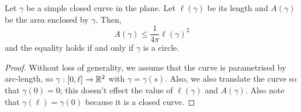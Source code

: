 \documentclass[11pt]{penrose}
\begin{document}
\begin{nthm}
    Let $\gamma$ be a simple closed curve in the plane. Let $\ell(\gamma)$ be its length and $A(\gamma)$ be the area enclosed by $\gamma$. Then,
    \begin{equation}
        A(\gamma) \leq \frac{1}{4\pi} \ell(\gamma)^2
    \end{equation}
    and the equality holds if and only if $\gamma$ is a circle.
\end{nthm}
\begin{proof}
    Without loss of generality, we assume that the curve is parametrised by arc-length, so $\gamma : [0, \ell] \to \mathbb{R}^2$ with $\gamma = \gamma(s)$. Also, we also translate the curve so that $\gamma(0) = 0$; this doesn't effect the value of $\ell(\gamma)$ and $A(\gamma)$. Also note that $\gamma(\ell) = \gamma(0)$ because it is a closed curve.


\end{proof}
\end{document}
